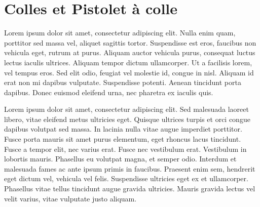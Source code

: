 \section{Colles et Pistolet à colle}
Lorem ipsum dolor sit amet, consectetur adipiscing elit. Nulla enim quam, porttitor sed massa vel, aliquet sagittis tortor. Suspendisse est eros, faucibus non vehicula eget, rutrum at purus. Aliquam auctor vehicula purus, consequat luctus lectus iaculis ultrices. Aliquam tempor dictum ullamcorper. Ut a facilisis lorem, vel tempus eros. Sed elit odio, feugiat vel molestie id, congue in nisl. Aliquam id erat non mi dapibus vulputate. Suspendisse potenti. Aenean tincidunt porta dapibus. Donec euismod eleifend urna, nec pharetra ex iaculis quis.

Lorem ipsum dolor sit amet, consectetur adipiscing elit. Sed malesuada laoreet libero, vitae eleifend metus ultricies eget. Quisque ultrices turpis et orci congue dapibus volutpat sed massa. In lacinia nulla vitae augue imperdiet porttitor. Fusce porta mauris sit amet purus elementum, eget rhoncus lacus tincidunt. Fusce a tempor elit, nec varius erat. Fusce nec vestibulum erat. Vestibulum in lobortis mauris. Phasellus eu volutpat magna, et semper odio. Interdum et malesuada fames ac ante ipsum primis in faucibus. Praesent enim sem, hendrerit eget dictum vel, vehicula vel felis. Suspendisse ultricies eget ex et ullamcorper. Phasellus vitae tellus tincidunt augue gravida ultricies. Mauris gravida lectus vel velit varius, vitae vulputate justo aliquam. 
